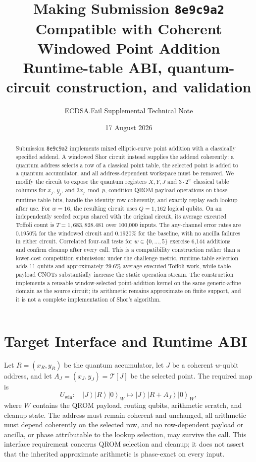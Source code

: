 \documentclass[10pt]{article}
\title{Making Submission \texttt{8e9c9a2} Compatible with Coherent Windowed Point Addition\\[2mm]\large Runtime-table ABI, quantum-circuit construction, and validation}
\author{ECDSA.Fail Supplemental Technical Note}
\date{17 August 2026}
\newcommand{\ket}[1]{\left\lvert #1\right\rangle}
\begin{document}
\maketitle

\begin{abstract}
Submission \texttt{8e9c9a2} implements mixed elliptic-curve point addition with a classically specified addend. A windowed Shor circuit instead supplies the addend coherently: a quantum address selects a row of a classical point table, the selected point is added to a quantum accumulator, and all address-dependent workspace must be removed. We modify the circuit to expose the quantum registers $X,Y,J$ and $3\cdot2^w$ classical table columns for $x_j$, $y_j$, and $3x_j\bmod p$, condition QROM payload operations on those runtime table bits, handle the identity row coherently, and exactly replay each lookup after use. For $w=16$, the resulting circuit uses $Q=1{,}162$ logical qubits. On an independently seeded corpus shared with the original circuit, its average executed Toffoli count is $T=1{,}683{,}828.481$ over 100,000 inputs. The any-channel error rates are $0.1950\%$ for the windowed circuit and $0.1920\%$ for the baseline, with no ancilla failures in either circuit. Correlated four-call tests for $w\in\{0,\ldots,5\}$ exercise 6,144 additions and confirm cleanup after every call. This is a compatibility construction rather than a lower-cost competition submission: under the challenge metric, runtime-table selection adds 11 qubits and approximately $29.6\%$ average executed Toffoli work, while table-payload CNOTs substantially increase the static operation stream. The construction implements a reusable window-selected point-addition kernel on the same generic-affine domain as the source circuit; its arithmetic remains approximate on finite support, and it is not a complete implementation of Shor's algorithm.
\end{abstract}

\section{Target Interface and Runtime ABI}

Let $R=(x_R,y_R)$ be the quantum accumulator, let $J$ be a coherent $w$-qubit address, and let $A_J=(x_J,y_J)=\mathcal T[J]$ be the selected point. The required map is
\begin{equation}
U_{\mathrm{win}}:\quad \ket{J}\ket{R}\ket{0}_{W}\longmapsto\ket{J}\ket{R+A_J}\ket{0}_{W},
\label{eq:window-map}
\end{equation}
where $W$ contains the QROM payload, routing qubits, arithmetic scratch, and cleanup state. The address must remain coherent and unchanged, all arithmetic must depend coherently on the selected row, and no row-dependent payload or ancilla, or phase attributable to the lookup selection, may survive the call. This interface requirement concerns QROM selection and cleanup; it does not assert that the inherited approximate arithmetic is phase-exact on every input.
\end{document}
